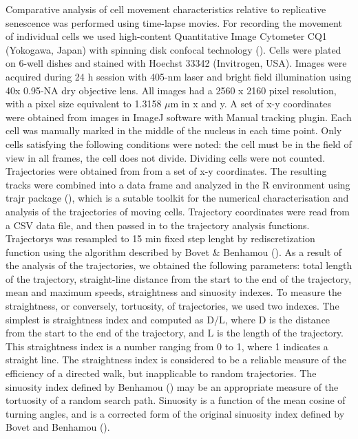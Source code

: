 \documentclass[alpha-refs]{wiley-article}
\begin{document}
Comparative analysis of cell movement characteristics relative to replicative senescence was performed using time-lapse movies.
For recording the movement of individual cells we used high-content Quantitative Image Cytometer CQ1 (Yokogawa, Japan) with spinning disk confocal technology (\cite{sakashita2015cq1}).
Cells were plated on 6-well dishes and stained with Hoechst 33342 (Invitrogen, USA).
Images were acquired during 24 h session with 405-nm laser and bright field illumination using 40x 0.95-NA dry objective lens.
All images had a 2560 x 2160 pixel resolution, with a pixel size equivalent to 1.3158 $\mu$m in x and y.
A set of x-y coordinates were obtained from images in ImageJ software with Manual tracking plugin.
Each cell was manually marked in the middle of the nucleus in each time point.
Only cells satisfying the following conditions were noted: the cell must be in the field of view in all frames, the cell does not divide.
Dividing cells were not counted.
Trajectories were obtained from from a set of x-y coordinates.
The resulting tracks were combined into a data frame and analyzed in the R environment using trajr package (\cite{mclean2018trajr}), which is a sutable toolkit for the numerical characterisation and analysis of the trajectories of moving cells.
Trajectory coordinates were read from a CSV data file, and then passed in to the trajectory analysis functions.
Trajectorys was resampled to 15 min fixed step lenght by rediscretization function using the algorithm described by Bovet \& Benhamou (\cite{bovet1988spatial}).
As a result of the analysis of the trajectories, we obtained the following parameters: total length of the trajectory, straight-line distance from the start to the end of the trajectory, mean and maximum speeds, straightness and sinuosity indexes.
To measure the straightness, or conversely, tortuosity, of trajectories, we used two indexes.
The simplest is straightness index and computed as D/L, where D is the distance from the start to the end of the trajectory, and L is the length of the trajectory.
This straightness index is a number ranging from 0 to 1, where 1 indicates a straight line.
The straightness index is considered to be a reliable measure of the efficiency of a directed walk, but inapplicable to random trajectories.
The sinuosity index defined by Benhamou (\cite{benhamou2004reliably}) may be an appropriate measure of the tortuosity of a random search path.
Sinuosity is a function of the mean cosine of turning angles, and is a corrected form of the original sinuosity index defined by Bovet and Benhamou (\cite{bovet1988spatial}).
\end{document}

